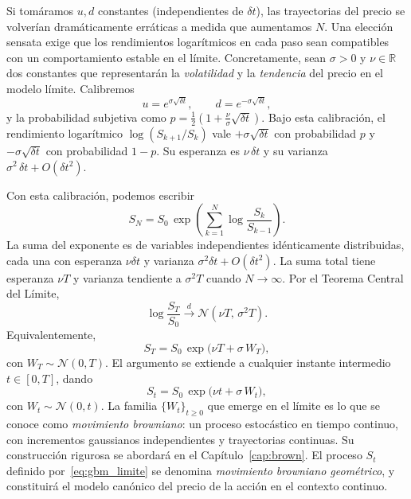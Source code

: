 \documentclass[11pt,a4paper,oneside]{report}
\theoremstyle{plain}
\theoremstyle{definition}
\theoremstyle{remark}
\newcommand{\R}{\mathbb{R}}
\newcommand{\1}{\mathbf{1}}
\begin{document}
Si tomáramos
$u, d$ constantes (independientes de $\delta t$), las trayectorias del
precio se volverían dramáticamente erráticas a medida que aumentamos
$N$. Una elección sensata exige que los rendimientos logarítmicos en
cada paso sean compatibles con un comportamiento estable en el límite.
Concretamente, sean $\sigma > 0$ y $\nu \in \R$ dos constantes que
representarán la \emph{volatilidad} y la \emph{tendencia} del precio en
el modelo límite. Calibremos
\begin{equation}\label{eq:calibracion_ud}
  u = e^{\sigma \sqrt{\delta t}}, \qquad
  d = e^{-\sigma \sqrt{\delta t}},
\end{equation}
y la probabilidad subjetiva como
$p = \tfrac{1}{2}(1 + \tfrac{\nu}{\sigma}\sqrt{\delta t})$. Bajo esta
calibración, el rendimiento logarítmico $\log(S_{k+1}/S_k)$ vale
$+\sigma\sqrt{\delta t}$ con probabilidad $p$ y $-\sigma\sqrt{\delta t}$
con probabilidad $1-p$. Su esperanza es $\nu\, \delta t$ y su varianza
$\sigma^2\, \delta t + O(\delta t^2)$.

Con esta calibración, podemos escribir
\begin{equation*}
  S_N = S_0\, \exp\!\left(\sum_{k=1}^{N} \log\frac{S_k}{S_{k-1}}\right).
\end{equation*}
La suma del exponente es de variables independientes idénticamente
distribuidas, cada una con esperanza $\nu \delta t$ y varianza $\sigma^2
\delta t + O(\delta t^2)$. La suma total tiene esperanza $\nu T$ y
varianza tendiente a $\sigma^2 T$ cuando $N \to \infty$. Por el Teorema
Central del Límite,
\begin{equation*}
  \log\!\frac{S_T}{S_0} \xrightarrow{d} \mathcal{N}(\nu T,\, \sigma^2 T).
\end{equation*}
Equivalentemente,
\begin{equation}\label{eq:gbm_limite}
  S_T = S_0\, \exp\bigl(\nu T + \sigma\, W_T\bigr),
\end{equation}
con $W_T \sim \mathcal{N}(0, T)$. El argumento se extiende a cualquier
instante intermedio $t \in [0, T]$, dando
\begin{equation*}
  S_t = S_0\, \exp\bigl(\nu t + \sigma\, W_t\bigr),
\end{equation*}
con $W_t \sim \mathcal{N}(0, t)$. La familia $\{W_t\}_{t \geq 0}$ que
emerge en el límite es lo que se conoce como \emph{movimiento
browniano}: un proceso estocástico en tiempo continuo, con incrementos
gaussianos independientes y trayectorias continuas. Su construcción
rigurosa se abordará en el Capítulo~\ref{cap:brown}. El proceso $S_t$
definido por~\eqref{eq:gbm_limite} se denomina \emph{movimiento
browniano geométrico}, y constituirá el modelo canónico del precio de
la acción en el contexto continuo.
\end{document}
